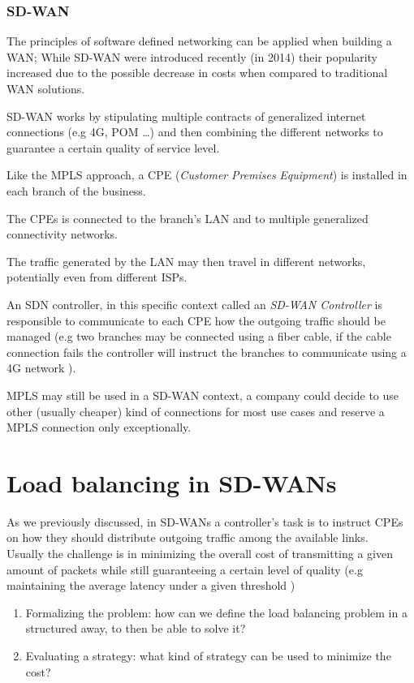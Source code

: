 \documentclass{article}
\begin{document}
   \subsubsection{SD-WAN}
   The principles of software defined networking can be applied when building a WAN;
   While SD-WAN were introduced recently (in 2014) their popularity increased due to the possible decrease in costs when compared to traditional WAN solutions.
   
   SD-WAN works by stipulating multiple contracts of generalized internet connections (e.g 4G, POM \dots) and then combining the different networks to guarantee a certain quality of service level.
  
   Like the MPLS approach, a CPE (\textit{Customer} \textit{Premises} \textit{Equipment}) is installed in each branch of the business.
   
   The CPEs is connected to the branch's LAN and to multiple generalized connectivity networks.
  
   The traffic generated by the LAN may then travel in different networks, potentially even from different ISPs.
   
   An SDN controller, in this specific context called an \textit{SD-WAN Controller} is responsible to communicate to each CPE how the outgoing traffic should be managed (e.g two branches may be connected using a fiber cable, if the cable connection fails the controller will instruct the branches to communicate using a 4G network ).
   
   MPLS may still be used in a SD-WAN context, a company could decide to use other (usually cheaper) kind of connections for most use cases and reserve a MPLS connection only exceptionally.
   
 
 \section{Load balancing in SD-WANs}
 
 As we previously discussed, in SD-WANs a controller's task is to instruct CPEs on how they should distribute outgoing traffic among the available links. \\
 Usually the challenge is in minimizing the overall cost of transmitting a given amount of packets while still guaranteeing a certain level of quality (e.g maintaining the average latency under a given threshold )
 \begin{enumerate}
 	\item Formalizing the problem: how can we define the load balancing problem in a structured away, to then be able to solve it?
 	\item Evaluating a strategy: what kind of strategy can be used to minimize the cost?
 \end{enumerate}
\pagebreak
\end{document}
